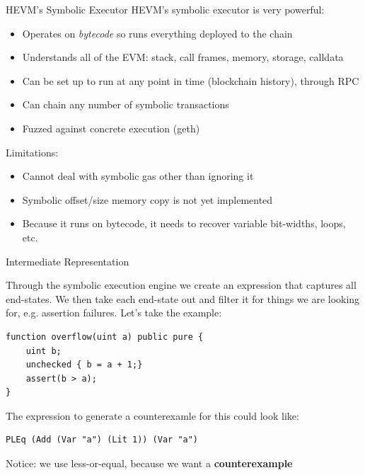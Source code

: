 \documentclass[aspectratio=169]{beamer}
\begin{document}
\begin{frame}{HEVM's Symbolic Executor}
HEVM's symbolic executor is very powerful:
\begin{itemize}
\item Operates on \emph{bytecode} so runs everything deployed to the chain
\item Understands all of the EVM: stack, call frames, memory, storage, calldata
\item Can be set up to run at any point in time (blockchain history), through RPC
\item Can chain any number of symbolic transactions
\item Fuzzed against concrete execution (geth)
\end{itemize}
\bigskip

Limitations:
\begin{itemize}
\item Cannot deal with symbolic gas other than ignoring it
\item Symbolic offset/size memory copy is not yet implemented
\item Because it runs on bytecode, it needs to recover variable bit-widths, loops, etc.
\end{itemize}
\end{frame}


\begin{frame}[fragile=singleslide]{Intermediate Representation}
\small

Through the symbolic execution engine we create an expression that captures all end-states. We then take each end-state out and filter it for things we are looking for, e.g. assertion failures. Let's take the example:


\begin{Verbatim}[frame=single, framerule=0.2mm,framesep=2mm,fontsize=\small]
function overflow(uint a) public pure {
	uint b;
	unchecked { b = a + 1;}
	assert(b > a);
}
\end{Verbatim}

The expression to generate a counterexamle for this could look like:

\begin{Verbatim}[frame=single, framerule=0.2mm, framesep=2mm,fontsize=\small]
PLEq (Add (Var "a") (Lit 1)) (Var "a")
\end{Verbatim}

Notice: we use less-or-equal, because we want a \textbf{counterexample}
\end{frame}
\end{document}
